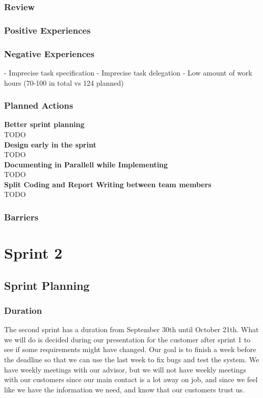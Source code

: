 \documentclass{report}
\begin{document}
\subsection{Review} \label{subsec:review1}
\subsection{Positive Experiences} \label{subsec:pos_exp1}
\subsection{Negative Experiences} \label{subsec:neg_exp1}
- Imprecise task specification
- Imprecise task delegation
- Low amount of work hours (70-100 in total vs 124 planned)
\subsection{Planned Actions} \label{subsec:planned_act1}
\textbf{Better sprint planning}\\
TODO \\
\textbf{Design early in the sprint}\\
TODO\\
\textbf{Documenting in Parallell while Implementing}\\
TODO\\
\textbf{Split Coding and Report Writing between team members}\\
TODO
\subsection{Barriers} \label{subsec:barriers1}

\chapter{Sprint 2} \label{cha:sprint_2}
\section{Sprint Planning} \label{sec:sprint_planning2}
\subsection{Duration} \label{subsec:duration2}
The second sprint has a duration from September 30th until October 21th. What we will do is decided during our presentation for the customer after sprint 1 to see if some requirements might have changed. Our goal is to finish a week before the deadline so that we can use the last week to fix bugs and test the system. We have weekly meetings with our advisor, but we will not have weekly meetings with our customers since our main contact is a lot away on job, and since we feel like we have the information we need, and know that our customers trust us.
\end{document}
